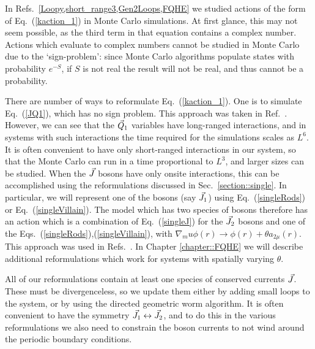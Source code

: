 In Refs.~\ref{Loopy,short_range3,Gen2Loops,FQHE} we studied actions of the form of Eq.~(\ref{kaction_1}) in Monte Carlo simulations. At first glance, this may not seem possible, as the third term in that equation contains a complex number. Actions which evaluate to complex numbers cannot be studied in Monte Carlo due to the `sign-problem': since Monte Carlo algorithms populate states with probability $e^{-S}$, if $S$ is not real the result will not be real, and thus cannot be a probability.

There are number of ways to reformulate Eq.~(\ref{kaction_1}). One is to simulate Eq.~(\ref{JQ1}), which has no sign problem. This approach was taken in Ref.~\cite{Gen2Loops}. However, we can see that the $\vec{Q}_1$ variables have long-ranged interactions, and in systems with such interactions the time required for the simulations scales as $L^6$. It is often convenient to have only short-ranged interactions in our system, so that the Monte Carlo can run in a time proportional to $L^3$, and larger sizes can be studied. 
When the $\vec{J}$ bosons have only onsite interactions, this can be accomplished using the reformulations discussed in Sec.~\ref{section::single}. In particular, we will represent one of the bosons (say $\vec{J}_1$) using Eq.~(\ref{singleRods}) or Eq.~(\ref{singleVillain}). The model which has two species of bosons therefore has an action which is a combination of Eq.~(\ref{singleJ}) for the $\vec{J}_2$ bosons and one of the Eqs.~(\ref{singleRods}),(\ref{singleVillain}), with $\nabla_mu\phi(r)\rightarrow\phi(r)+\theta a_{2\mu}(r)$. This approach was used in Refs.~\cite{Loopy,short_range3}. 
In Chapter \ref{chapter::FQHE} we will describe additional reformulations which work for systems with spatially varying $\theta$. 

All of our reformulations contain at least one species of conserved currents $\vec{J}$. These must be divergenceless, so we update them either by adding small loops to the system, or by using the directed geometric worm algorithm\cite{Sorensen}. It is often convenient to have the symmetry $\vec{J}_1\leftrightarrow\vec{J}_2$, and to do this in the various reformulations we also need to constrain the boson currents to not wind around the periodic boundary conditions.

